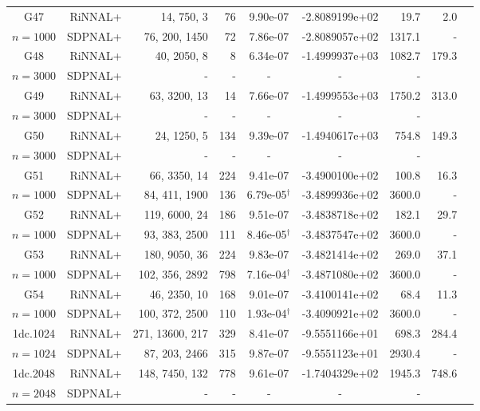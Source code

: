 \documentclass[11pt]{article}
\theoremstyle{plain}
\begin{document}
\begin{footnotesize}
\begin{longtable}[c]{crrrccrrr}
G47& RiNNAL+ & 14, 750, 3 & 76 & 9.90e-07 & -2.8089199e+02 & 19.7 &2.0 \\ 
$n=1000$ & SDPNAL+ & 76, 200, 1450 & 72& 7.86e-07 & -2.8089057e+02 & 1317.1 & - \\ [3pt] 

G48& RiNNAL+ & 40, 2050, 8 & 8 & 6.34e-07 & -1.4999937e+03 & 1082.7 &179.3 \\ 
$n=3000$ & SDPNAL+ & - & - & - & - & - \\ [3pt] 

G49& RiNNAL+ & 63, 3200, 13 & 14 & 7.66e-07 & -1.4999553e+03 & 1750.2 &313.0 \\ 
$n=3000$ & SDPNAL+ & - & - & - & - & - \\ [3pt] 

G50& RiNNAL+ & 24, 1250, 5 & 134 & 9.39e-07 & -1.4940617e+03 & 754.8 &149.3 \\ 
$n=3000$ & SDPNAL+ & - & - & - & - & - \\ [3pt] 

G51& RiNNAL+ & 66, 3350, 14 & 224 & 9.41e-07 & -3.4900100e+02 & 100.8 &16.3 \\ 
$n=1000$ & SDPNAL+ & 84, 411, 1900 & 136& 6.79e-05$^{\dagger}$ & -3.4899936e+02 & 3600.0 & - \\ [3pt] 

G52& RiNNAL+ & 119, 6000, 24 & 186 & 9.51e-07 & -3.4838718e+02 & 182.1 &29.7 \\ 
$n=1000$ & SDPNAL+ & 93, 383, 2500 & 111& 8.46e-05$^{\dagger}$ & -3.4837547e+02 & 3600.0 & - \\ [3pt] 

G53& RiNNAL+ & 180, 9050, 36 & 224 & 9.83e-07 & -3.4821414e+02 & 269.0 &37.1 \\ 
$n=1000$ & SDPNAL+ & 102, 356, 2892 & 798& 7.16e-04$^{\dagger}$ & -3.4871080e+02 & 3600.0 & - \\ [3pt] 

G54& RiNNAL+ & 46, 2350, 10 & 168 & 9.01e-07 & -3.4100141e+02 & 68.4 &11.3 \\ 
$n=1000$ & SDPNAL+ & 100, 372, 2500 & 110& 1.93e-04$^{\dagger}$ & -3.4090921e+02 & 3600.0 & - \\ [3pt] 

1dc.1024& RiNNAL+ & 271, 13600, 217 & 329 & 8.41e-07 & -9.5551166e+01 & 698.3 &284.4 \\ 
$n=1024$ & SDPNAL+ & 87, 203, 2466 & 315& 9.87e-07 & -9.5551123e+01 & 2930.4 & - \\ [3pt] 

1dc.2048& RiNNAL+ & 148, 7450, 132 & 778 & 9.61e-07 & -1.7404329e+02 & 1945.3 &748.6 \\ 
$n=2048$ & SDPNAL+ & - & - & - & - & - \\ [3pt] 


\end{longtable}
\end{footnotesize}
\end{document}
